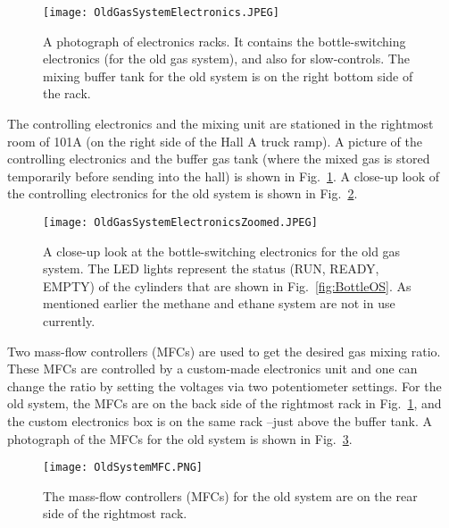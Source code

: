 \begin{figure}[h!]
\begin{center}
\texttt{[image: OldGasSystemElectronics.JPEG]}
\caption{A photograph of electronics racks. It contains the bottle-switching electronics (for the old gas system), and also for slow-controls. The mixing buffer tank for the old system is on the right bottom side of the rack.}
\label{fig:ElectronicsOS}
\end{center}
\end{figure}
The controlling electronics and the mixing unit are stationed in the rightmost room of 101A (on the right side of the Hall A truck ramp).
 A picture of the controlling electronics and the buffer gas tank (where the mixed gas is 
stored temporarily before sending into the hall) is shown in Fig.~\ref{fig:ElectronicsOS}.
 A close-up look of the controlling electronics for the old system is shown in Fig.~\ref{fig:ZoomedElecOS}.
\begin{figure}[h!]
\begin{center}
\texttt{[image: OldGasSystemElectronicsZoomed.JPEG]}
\caption{A close-up look at the bottle-switching electronics for the old gas system. The LED lights represent the status (RUN, READY, EMPTY) of the cylinders that are shown in Fig.~\ref{fig:BottleOS}. As mentioned earlier the methane and ethane system are not in use currently.} 
\label{fig:ZoomedElecOS}
\end{center}
\end{figure}

Two mass-flow controllers (MFCs) are used to get the desired gas mixing ratio.
 These MFCs are controlled by a custom-made electronics unit and one can change
 the ratio by setting the voltages via two potentiometer settings.
 For the old system, the MFCs are on the back side of the rightmost rack in Fig.~\ref{fig:ElectronicsOS},
 and the custom electronics box is on the same rack --just above the buffer tank.
 A photograph of the MFCs for the old system is shown in Fig.~\ref{fig:OldSystemMFC}.

\begin{figure}[h!]
\begin{center}
\texttt{[image: OldSystemMFC.PNG]}
\caption{The mass-flow controllers (MFCs) for the old system are on the rear side of the rightmost rack.} 
\label{fig:OldSystemMFC}
\end{center}
\end{figure}

